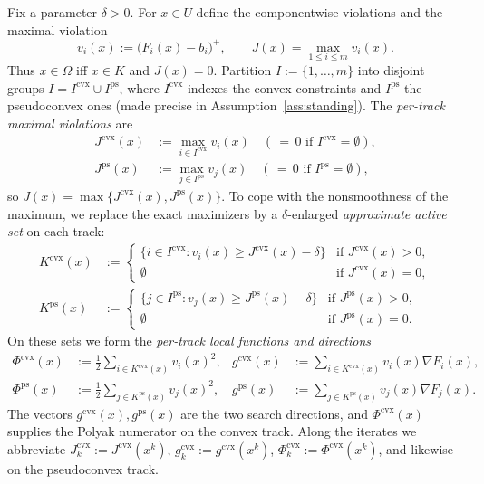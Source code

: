 \documentclass[]{interact}
\theoremstyle{plain}
\theoremstyle{definition}
\theoremstyle{remark}
\newcommand{\cvx}{\mathrm{cvx}}
\newcommand{\ps}{\mathrm{ps}}
\begin{document}
Fix a parameter $\delta>0$. For $x\in U$ define the componentwise violations and the
maximal violation
\begin{equation}\label{eq:vi}
v_i(x):=\bigl(F_i(x)-b_i\bigr)^+,\qquad J(x)=\max_{1\le i\le m}v_i(x).
\end{equation}
Thus $x\in\Omega$ iff $x\in K$ and $J(x)=0$. Partition $I:=\{1,\dots,m\}$ into disjoint
groups $I=I^{\cvx}\cup I^{\ps}$, where $I^{\cvx}$ indexes the convex constraints and
$I^{\ps}$ the pseudoconvex ones (made precise in Assumption~\ref{ass:standing}). The
\emph{per-track maximal violations} are
\begin{align}
J^{\cvx}(x)&:=\max_{i\in I^{\cvx}}v_i(x)\quad(\,{=}\,0\text{ if }I^{\cvx}=\emptyset),\label{eq:Jcvx}\\
J^{\ps}(x)&:=\max_{j\in I^{\ps}}v_j(x)\quad(\,{=}\,0\text{ if }I^{\ps}=\emptyset),\label{eq:Jps}
\end{align}
so $J(x)=\max\{J^{\cvx}(x),J^{\ps}(x)\}$. To cope with the nonsmoothness of the maximum,
we replace the exact maximizers by a $\delta$-enlarged \emph{approximate active
set} on each track:
\begin{align}
K^{\cvx}(x)&:=\begin{cases}\{i\in I^{\cvx}:v_i(x)\ge J^{\cvx}(x)-\delta\} & \text{if }J^{\cvx}(x)>0,\\ \emptyset & \text{if }J^{\cvx}(x)=0,\end{cases}\label{eq:Kcvx}\\[2pt]
K^{\ps}(x)&:=\begin{cases}\{j\in I^{\ps}:v_j(x)\ge J^{\ps}(x)-\delta\} & \text{if }J^{\ps}(x)>0,\\ \emptyset & \text{if }J^{\ps}(x)=0.\end{cases}\label{eq:Kps}
\end{align}
On these sets we form the \emph{per-track local functions and directions}
\begin{align}
\Phi^{\cvx}(x)&:=\tfrac12\!\!\sum_{i\in K^{\cvx}(x)}\!\! v_i(x)^2, & g^{\cvx}(x)&:=\!\!\sum_{i\in K^{\cvx}(x)}\!\! v_i(x)\nabla F_i(x),\label{eq:phi-g-cvx}\\
\Phi^{\ps}(x)&:=\tfrac12\!\!\sum_{j\in K^{\ps}(x)}\!\! v_j(x)^2, & g^{\ps}(x)&:=\!\!\sum_{j\in K^{\ps}(x)}\!\! v_j(x)\nabla F_j(x).\label{eq:phi-g-ps}
\end{align}
The vectors $g^{\cvx}(x),g^{\ps}(x)$ are the two search directions, and $\Phi^{\cvx}(x)$
supplies the Polyak numerator on the convex track. Along the iterates we abbreviate
$J^{\cvx}_k:=J^{\cvx}(x^k)$, $g^{\cvx}_k:=g^{\cvx}(x^k)$, $\Phi^{\cvx}_k:=\Phi^{\cvx}(x^k)$,
and likewise on the pseudoconvex track.
\end{document}

